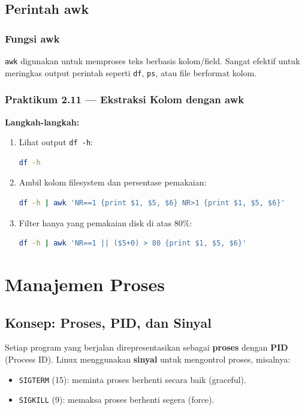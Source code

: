 \subsection{Perintah awk}
\subsubsection*{Fungsi awk}
\texttt{awk} digunakan untuk memproses teks berbasis kolom/field. Sangat efektif untuk meringkas output perintah seperti \texttt{df}, \texttt{ps},
atau file berformat kolom.

\subsubsection*{Praktikum 2.11 --- Ekstraksi Kolom dengan awk}
\textbf{Langkah-langkah:}
\begin{enumerate}
    \item Lihat output \texttt{df -h}:
\begin{lstlisting}[language=bash, caption={Output df -h}]
df -h
\end{lstlisting}

    \item Ambil kolom filesystem dan persentase pemakaian:
\begin{lstlisting}[language=bash, caption={awk print kolom tertentu}]
df -h | awk 'NR==1 {print $1, $5, $6} NR>1 {print $1, $5, $6}'
\end{lstlisting}

    \item Filter hanya yang pemakaian disk di atas 80\%:
\begin{lstlisting}[language=bash, caption={awk filter berdasarkan kondisi}]
df -h | awk 'NR==1 || ($5+0) > 80 {print $1, $5, $6}'
\end{lstlisting}
\end{enumerate}


\section{Manajemen Proses}
\label{sec:process-commands}

\subsection*{Konsep: Proses, PID, dan Sinyal}
Setiap program yang berjalan direpresentasikan sebagai \textbf{proses} dengan \textbf{PID} (Process ID).
Linux menggunakan \textbf{sinyal} untuk mengontrol proses, misalnya:
\begin{itemize}
    \item \texttt{SIGTERM} (15): meminta proses berhenti secara baik (graceful).
    \item \texttt{SIGKILL} (9): memaksa proses berhenti segera (force).
\end{itemize}

